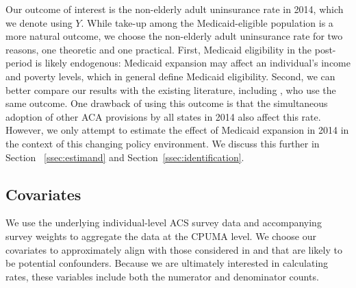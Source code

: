 \documentclass[aoas]{imsart}
\theoremstyle{plain}
\theoremstyle{remark}
\begin{document}
Our outcome of interest is the non-elderly adult uninsurance rate in 2014, which we denote using $Y$. While take-up among the Medicaid-eligible population is a more natural outcome, we choose the non-elderly adult uninsurance rate for two reasons, one theoretic and one practical. First, Medicaid eligibility in the post-period is likely endogenous: Medicaid expansion may affect an individual's income and poverty levels, which in general define Medicaid eligibility. Second, we can better compare our results with the existing literature, including \cite{courtemanche2017early}, who use the same outcome. One drawback of using this outcome is that the simultaneous adoption of other ACA provisions by all states in 2014 also affect this rate. However, we only attempt to estimate the effect of Medicaid expansion in 2014 in the context of this changing policy environment. We discuss this further in Section ~\ref{ssec:estimand} and Section~\ref{ssec:identification}. 

\subsection{Covariates}

We use the underlying individual-level ACS survey data and accompanying survey weights to aggregate the data at the CPUMA level. We choose our covariates to approximately align with those considered in \cite{courtemanche2017early} and that are likely to be potential confounders. Because we are ultimately interested in calculating rates, these variables include both the numerator and denominator counts. 
\end{document}
